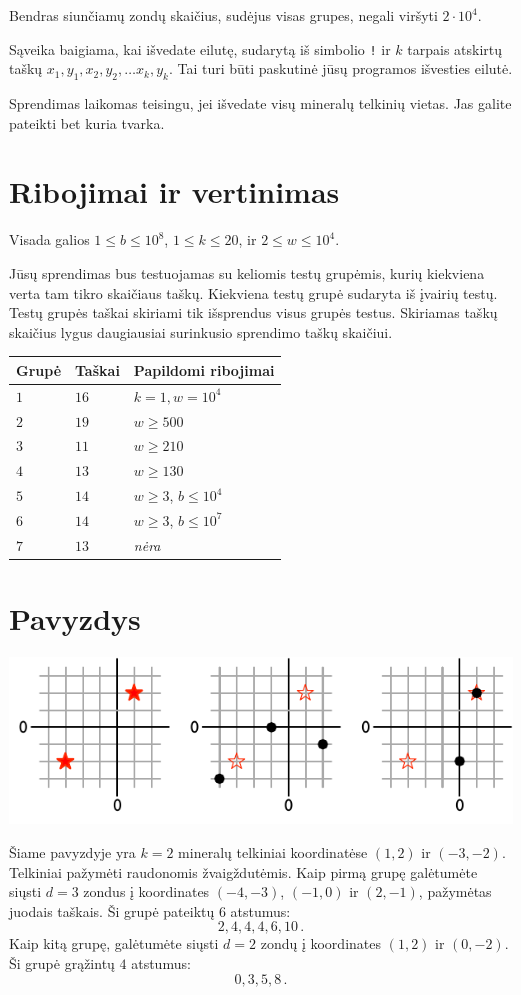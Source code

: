 Bendras siunčiamų zondų skaičius, sudėjus visas grupes, negali viršyti
$2\cdot 10^4.$ %

Sąveika baigiama, kai išvedate eilutę, sudarytą iš simbolio \texttt{!} ir
$k$ tarpais atskirtų taškų $x_1, y_1, x_2, y_2, \ldots x_k, y_k$.
Tai turi būti paskutinė jūsų programos išvesties eilutė.

Sprendimas laikomas teisingu, jei išvedate visų mineralų telkinių vietas. 
Jas galite pateikti bet kuria tvarka.

\section*{Ribojimai ir vertinimas}
Visada galios
$1\leq b \leq 10^8$, %
$1 \leq k \leq 20$, %
ir
$2 \le w \le 10^4$. %

Jūsų sprendimas bus testuojamas su keliomis testų grupėmis, kurių kiekviena verta tam tikro skaičiaus taškų.
Kiekviena testų grupė sudaryta iš įvairių testų.
Testų grupės taškai skiriami tik išsprendus visus grupės testus.
Skiriamas taškų skaičius lygus daugiausiai surinkusio sprendimo taškų skaičiui.

\medskip
\begin{tabular}{lll}
	Grupė & Taškai & Papildomi ribojimai \\\hline
  $1$ & $16$ & $k = 1, w = 10^4$\\
  $2$ & $19$ & $w \ge 500$\\
  $3$ & $11$ & $w \ge 210$\\
  $4$ & $13$ & $w \ge 130$\\
  $5$ & $14$ & $w \ge 3$, $b \le 10^4$\\
  $6$ & $14$ & $w \ge 3$, $b \le 10^7$\\
  $7$ & $13$ & \emph{nėra}
\end{tabular}
\section*{Pavyzdys}
\includegraphics[width=.6\textwidth]{img/sample1.pdf}

Šiame pavyzdyje yra $k=2$ mineralų telkiniai koordinatėse $(1,2)$ ir $(-3,-2)$. Telkiniai pažymėti raudonomis žvaigždutėmis.
Kaip pirmą grupę galėtumėte siųsti $d=3$ zondus į koordinates $(-4,-3)$, $(-1, 0)$ ir $(2,-1)$, pažymėtas juodais taškais.
Ši grupė pateiktų $6$ atstumus: \[
2, 4, 4, 4, 6, 10\,.
\]
Kaip kitą grupę, galėtumėte siųsti $d=2$ zondų į koordinates $(1,2)$ ir $(0,-2)$.
Ši grupė grąžintų $4$ atstumus: \[
0, 3, 5, 8\,.
\]
